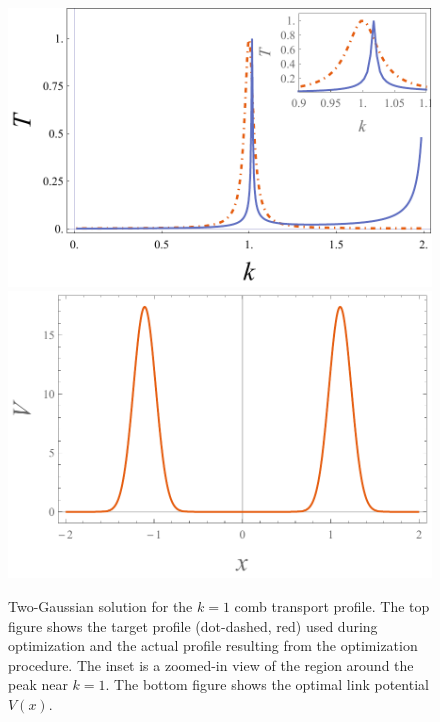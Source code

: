 \documentclass[twocolumn,amsmath,amssymb,showpacs,prl,superscriptaddress,aps]{revtex4-1}
\begin{document}
\begin{figure}
   \includegraphics[width=1\linewidth]{figures/plot_transport_profiles.pdf}
   \includegraphics[width=1\linewidth]{figures/plot_link_potential.pdf}
 \caption[Single comb link potential]{Two-Gaussian solution for the $k=1$ comb transport profile. The top figure shows the target profile (dot-dashed, red) used during optimization and the actual profile resulting from the optimization procedure. The inset is a zoomed-in view of the region around the peak near $k=1$. The bottom figure shows the optimal link potential $V(x)$.}
 \label{fig:method_illustration}
\end{figure}

\end{document}
